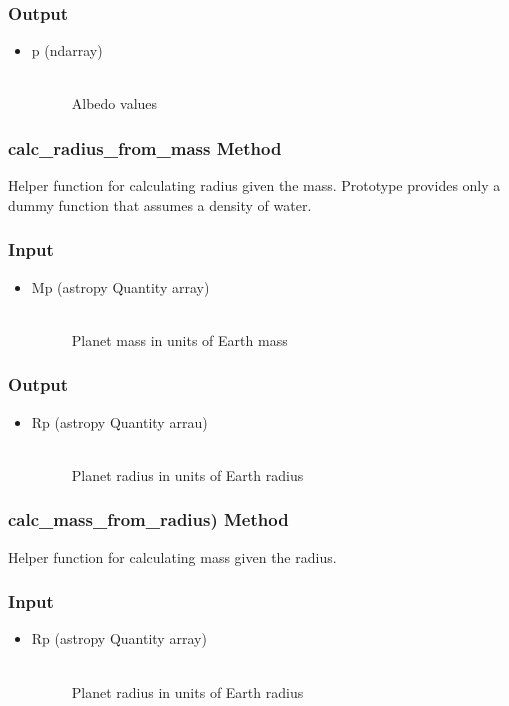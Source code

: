 \documentclass[cleanfoot]{asme2ej}
\begin{document}
\subsubsection*{Output}
\begin{itemize}
\item
\begin{description}
    \item[p (ndarray)] \hfill \\ Albedo values
\end{description}
\end{itemize}

\subsubsection{calc\_radius\_from\_mass Method} \label{sec:calcradiusfrommasstask}
Helper function for calculating radius given the mass. Prototype provides only a dummy function that assumes a density of water.
\subsubsection*{Input}
\begin{itemize}
\item
\begin{description}
    \item[Mp (astropy Quantity array)] \hfill \\ Planet mass in units of Earth mass
\end{description}
\end{itemize}
\subsubsection*{Output}
\begin{itemize}
\item
\begin{description}
    \item[Rp (astropy Quantity arrau)] \hfill \\ Planet radius in units of Earth radius
\end{description}
\end{itemize}

\subsubsection{calc\_mass\_from\_radius) Method} \label{sec:calcmassfromradiustask}
Helper function for calculating mass given the radius.
\subsubsection*{Input}
\begin{itemize}
\item
\begin{description}
    \item[Rp (astropy Quantity array)] \hfill \\ Planet radius in units of Earth radius
\end{description}
\end{itemize}
\end{document}
